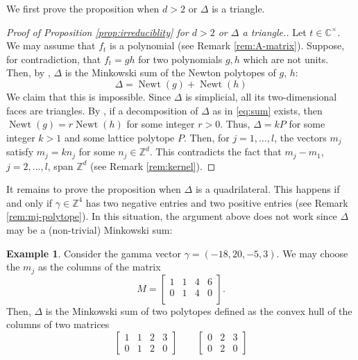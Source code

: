 \documentclass[11pt, reqno]{amsart}
\theoremstyle{plain}
\theoremstyle{definition}
\newtheorem{example}[thm]{Example}
\newcommand{\CC}{\mathbb{C}}
\newcommand{\Z}{\mathbb{Z}}
\newcommand{\ZZ}{\mathbb{Z}}
\newcommand{\ga}{\gamma}
\begin{document}
We first prove the proposition when $d>2$ or $\Delta$ is a triangle. 

\begin{proof}[Proof of Proposition \ref{prop:irreduciblity} for $d>2$ or $\Delta$ a triangle.]
Let $t \in \CC^\times$. We may assume that $f_t$ is a polynomial (see Remark \ref{rem:A-matrix}).
Suppose, for contradiction, that $f_t= gh$ for two polynomials $g,h$ which are not units. 
Then, by \cite{Ostro}, $\Delta$ is the Minkowski sum of the Newton polytopes of $g$, $h$:
\begin{equation}
\label{eq:sum}
\Delta= \operatorname{Newt}(g) +\operatorname{Newt}(h) 
\end{equation} 
We claim that this is impossible.
Since $\Delta$ is simplicial, all its two-dimensional faces are triangles. By \cite[(13)]{Decomp-convex}, if a decomposition of $\Delta$ as in \eqref{eq:sum} exists, then $\operatorname{Newt}(g) = r\operatorname{Newt}(h)$ for some integer $r>0$.
Thus, $\Delta = kP$ for some integer $k>1$ and some lattice polytope $P$. Then, for $j=1, \dots, l$, the vectors $m_j$ satisfy $m_j = k n_j$ for some $n_j \in \Z^{d}$. This contradicts the fact that $m_j-m_1$, $j=2,\dots,l$, span $\Z^{d}$ (see Remark \ref{rem:kernel}).
\end{proof}

It remains to prove the proposition when $\Delta$ is a quadrilateral. This happens if and only if $\gamma\in \ZZ^4$ has two negative entries and two positive entries (see Remark \ref{rem:mj-polytope}).
In this situation, the argument above does not work since $\Delta$ may be a (non-trivial) Minkowski sum:

\begin{example}
Consider the gamma vector $\ga= (-18, 20, -5, 3)$. We may choose the $m_j$ as the columns of the matrix
\[
M= \begin{bmatrix}
1 & 1 & 4 & 6 \\
0 & 1 & 4 & 0 \\
\end{bmatrix}.
\]
Then, $\Delta$ is the Minkowski sum of two  polytopes defined as the convex hull of the columns of two matrices 
\[
\begin{bmatrix}
1 & 1 & 2 & 3 \\
0 & 1 & 2 & 0
\end{bmatrix} \qquad
\begin{bmatrix}
0 & 2 & 3 \\
0 & 2 & 0
\end{bmatrix}
\]
\end{example}
\smallskip
\end{document}
